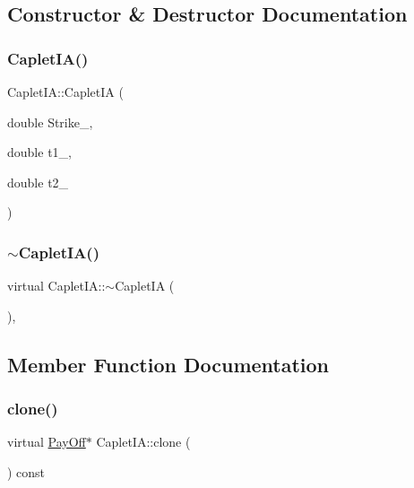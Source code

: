 \subsection{Constructor \& Destructor Documentation}
\hypertarget{classCapletIA_aa5244330f5862e096ad16103e2b85688}{}\label{classCapletIA_aa5244330f5862e096ad16103e2b85688} 
\subsubsection{\texorpdfstring{Caplet\+I\+A()}{CapletIA()}}
{\footnotesize\ttfamily Caplet\+I\+A\+::\+Caplet\+IA (\begin{DoxyParamCaption}\item[{double}]{Strike\+\_\+,  }\item[{double}]{t1\+\_\+,  }\item[{double}]{t2\+\_\+ }\end{DoxyParamCaption})}

\hypertarget{classCapletIA_a05baa7e93ab0962a85520477dc820f51}{}\label{classCapletIA_a05baa7e93ab0962a85520477dc820f51} 
\subsubsection{\texorpdfstring{$\sim$\+Caplet\+I\+A()}{~CapletIA()}}
{\footnotesize\ttfamily virtual Caplet\+I\+A\+::$\sim$\+Caplet\+IA (\begin{DoxyParamCaption}{ }\end{DoxyParamCaption})\hspace{0.3cm}{\ttfamily [inline]}, {\ttfamily [virtual]}}



\subsection{Member Function Documentation}
\hypertarget{classCapletIA_aebfbd05a398b551b43ac3118732934ba}{}\label{classCapletIA_aebfbd05a398b551b43ac3118732934ba} 
\subsubsection{\texorpdfstring{clone()}{clone()}}
{\footnotesize\ttfamily virtual \hyperlink{classPayOff}{Pay\+Off}$\ast$ Caplet\+I\+A\+::clone (\begin{DoxyParamCaption}{ }\end{DoxyParamCaption}) const\hspace{0.3cm}{\ttfamily [virtual]}}



